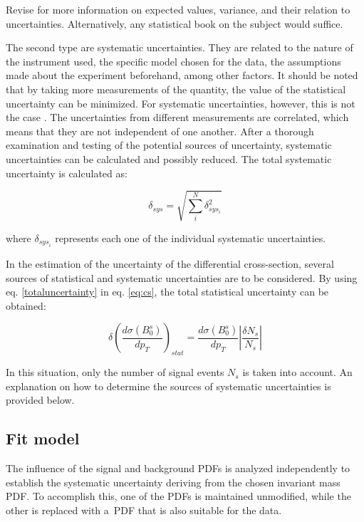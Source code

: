 Revise \cite{vsirca2016probability} for more information on expected values, variance, and their relation to uncertainties. Alternatively, any statistical book on the subject would suffice.

The second type are systematic uncertainties. They are related to the nature of the instrument used, the specific model chosen for the data, the assumptions made about the experiment beforehand, among other factors. It should be noted that by taking more measurements of the quantity, the value of the statistical uncertainty can be minimized. For systematic uncertainties, however, this is not the case \cite{sinervo2003definition}. The uncertainties from different measurements are correlated, which means that they are not independent of one another. After a thorough examination and testing of the potential sources of uncertainty, systematic uncertainties can be calculated and possibly reduced. The total systematic uncertainty is calculated as:

\begin{equation}
	\delta_{sys} = \sqrt{\sum_{i}^{N} \delta_{{sys}_{i}}^2}
\end{equation}

where $\delta_{{sys}_i}$ represents each one of the individual systematic uncertainties.

In the estimation of the uncertainty of the differential cross-section, several sources of statistical and systematic uncertainties are to be considered. By using eq. \ref{totaluncertainty} in eq. \ref{eq:cs}, the total statistical uncertainty can be obtained:

\begin{equation}
	\delta \left(\frac{d\sigma(B_0^s)}{dp_T} \right)_{stat} 
 =\frac{d \sigma(B_0^s)}{dp_T}\left| \frac{\delta N_s}{N_s}\right|
 \end{equation}

In this situation, only the number of signal events $N_s$ is taken into account. An explanation on how to determine the sources of systematic uncertainties is provided below. 

\subsection{Fit model}

The influence of the signal and background PDFs is analyzed independently to establish the systematic uncertainty deriving from the chosen invariant mass PDF. To accomplish this, one of the PDFs is maintained unmodified, while the other is replaced with a PDF that is also suitable for the data.

